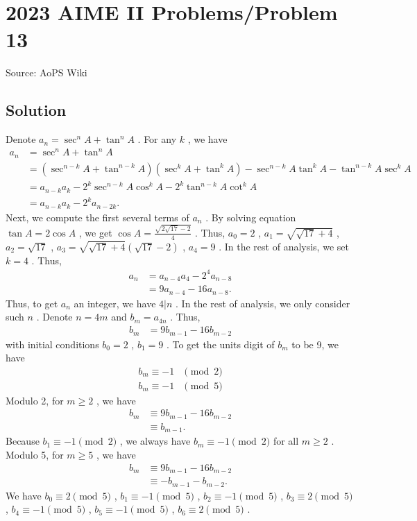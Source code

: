 \documentclass[12pt]{article}
\begin{document}
\section*{{2023 AIME II Problems/Problem 13}}
Source: AoPS Wiki

\subsection*{Solution}
Denote $a_n = \sec^n A + \tan^n A$ .
For any $k$ , we have \begin{align*} a_n & = \sec^n A + \tan^n A \\ & = \left( \sec^{n-k} A + \tan^{n-k} A \right) \left( \sec^k A + \tan^k A \right) - \sec^{n-k} A \tan^k A - \tan^{n-k} A \sec^k A \\ & = a_{n-k} a_k - 2^k \sec^{n-k} A \cos^k A - 2^k \tan^{n-k} A \cot^k A \\ & = a_{n-k} a_k - 2^k a_{n-2k} . \end{align*} Next, we compute the first several terms of $a_n$ . By solving equation $\tan A = 2 \cos A$ , we get $\cos A = \frac{\sqrt{2 \sqrt{17} - 2}}{4}$ .
Thus, $a_0 = 2$ , $a_1 = \sqrt{\sqrt{17} + 4}$ , $a_2 = \sqrt{17}$ , $a_3 = \sqrt{\sqrt{17} + 4} \left( \sqrt{17} - 2 \right)$ , $a_4 = 9$ . In the rest of analysis, we set $k = 4$ .
Thus, \begin{align*} a_n & = a_{n-4} a_4 - 2^4 a_{n-8} \\ & = 9 a_{n-4} - 16 a_{n-8} . \end{align*} Thus, to get $a_n$ an integer, we have $4 | n$ .
In the rest of analysis, we only consider such $n$ . Denote $n = 4 m$ and $b_m = a_{4n}$ .
Thus, \begin{align*} b_m & = 9 b_{m-1} - 16 b_{m-2} \end{align*} with initial conditions $b_0 = 2$ , $b_1 = 9$ . To get the units digit of $b_m$ to be 9, we have \begin{align*} b_m \equiv -1 & \pmod{2} \\ b_m \equiv -1 & \pmod{5} \end{align*} Modulo 2, for $m \geq 2$ , we have \begin{align*} b_m & \equiv 9 b_{m-1} - 16 b_{m-2} \\ & \equiv b_{m-1} . \end{align*} Because $b_1 \equiv -1 \pmod{2}$ , we always have $b_m \equiv -1 \pmod{2}$ for all $m \geq 2$ . Modulo 5, for $m \geq 5$ , we have \begin{align*} b_m & \equiv 9 b_{m-1} - 16 b_{m-2} \\ & \equiv - b_{m-1} - b_{m-2} . \end{align*} We have $b_0 \equiv 2 \pmod{5}$ , $b_1 \equiv -1 \pmod{5}$ , $b_2 \equiv -1 \pmod{5}$ , $b_3 \equiv 2 \pmod{5}$ , $b_4 \equiv -1 \pmod{5}$ , $b_5 \equiv -1 \pmod{5}$ , $b_6 \equiv 2 \pmod{5}$ .
\end{document}
